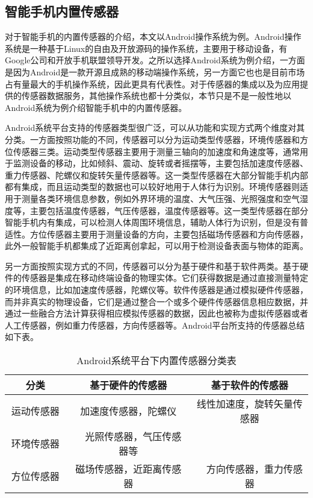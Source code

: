 \subsection{智能手机内置传感器}
\par 对于智能手机的内置传感器的介绍，本文以Android操作系统为例。Android操作系统是一种基于Linux的自由及开放源码的操作系统，主要用于移动设备，有Google公司和开放手机联盟领导开发。之所以选择Android系统为例介绍，一方面是因为Android是一款开源且成熟的移动端操作系统，另一方面它也也是目前市场占有量最大的手机操作系统，因此更具有代表性。对于传感器的集成以及为应用提供的传感器数据服务，其他操作系统也都十分类似，本节只是不是一般性地以Android系统为例介绍智能手机中的内置传感器。
\par Android系统平台支持的传感器类型很广泛，可以从功能和实现方式两个维度对其分类。一方面按照功能的不同，传感器可以分为运动类型传感器，环境传感器和方位传感器三类。运动类型传感器主要用于测量三轴向的加速度和角速度等，通常用于监测设备的移动，比如倾斜、震动、旋转或者摇摆等，主要包括加速度传感器、重力传感器、陀螺仪和旋转矢量传感器等。这一类型传感器在大部分智能手机内部都有集成，而且运动类型的数据也可以较好地用于人体行为识别。环境传感器则适用于测量各类环境信息参数，例如外界环境的温度、大气压强、光照强度和空气湿度等，主要包括温度传感器，气压传感器，温度传感器等。这一类型传感器在部分智能手机内有集成，可以检测人体周围环境信息，辅助人体行为识别，但是没有普适性。方位传感器主要用于测量设备的方向，主要包括磁场传感器和方向传感器，此外一般智能手机都集成了近距离创拿起，可以用于检测设备表面与物体的距离。
\par 另一方面按照实现方式的不同，传感器可以分为基于硬件和基于软件两类。基于硬件的传感器是集成在移动终端设备的物理实体。它们获得数据是通过直接测量特定的环境信息，比如加速度传感器，陀螺仪等。软件传感器是通过模拟硬件传感器，而并非真实的物理设备，它们是通过整合一个或多个硬件传感器信息相应数据，并通过一些融合方法计算获得相应模拟传感器的数据，因此也被称为虚拟传感器或者人工传感器，例如重力传感器，方向传感器等。Android平台所支持的传感器总结如下表。

\begin{table}[htbp]
\centering
\caption{Android系统平台下内置传感器分类表}
\begin{tabular}{|c|c|c|}
    \hline
    分类 & 基于硬件的传感器　& 基于软件的传感器 \\
    \hline
    运动传感器 & 加速度传感器，陀螺仪 & 线性加速度，旋转矢量传感器\\
    \hline
    环境传感器　&　光照传感器，气压传感器等　&  \\
    \hline
    方位传感器　& 磁场传感器，近距离传感器　&　方向传感器，重力传感器 \\
    \hline
\end{tabular}
\end{table}

